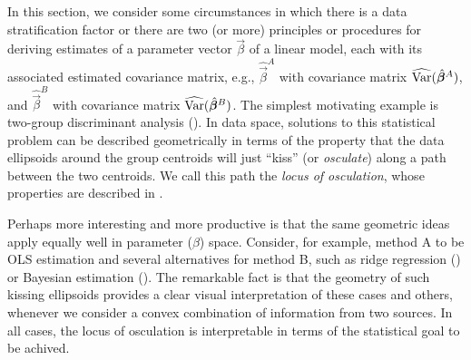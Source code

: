 %

In this section, we consider some circumstances in which there is a data stratification factor or there are two (or more)
principles or procedures for deriving estimates of a parameter vector $\vec{\beta}$
of a linear model,
each with its associated estimated covariance matrix, e.g.,
$\widehat{\vec{\beta}}^A$ with covariance matrix $\widehat{\mathrm{Var}}(\hat{\bm{\beta}}^A)$,
and
$\widehat{\vec{\beta}}^B$ with covariance matrix $\widehat{\mathrm{Var}}(\hat{\bm{\beta}}^B)$.
The simplest motivating example is two-group discriminant analysis ().
In data space, solutions to this statistical problem can be described geometrically
in terms of the property that the data ellipsoids around the group centroids 
will just ``kiss''
(or \emph{osculate}) along a path between the two centroids. We call this path
the \emph{locus of osculation}, whose properties are described in .

Perhaps more interesting and more productive is that the same geometric ideas
apply equally well in parameter ($\beta$) space. Consider, for example,
method A to be OLS estimation and several alternatives
for method B, such as ridge regression () or Bayesian estimation
(). The remarkable fact is that the geometry of such kissing
ellipsoids provides a clear visual interpretation of these cases and others,
whenever we consider a convex combination of information from two sources. In all cases,
the locus of osculation is interpretable in
terms of the statistical goal to be achived.


